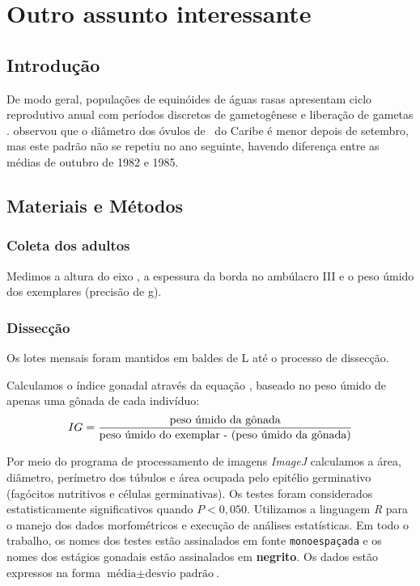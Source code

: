 \chapter{Outro assunto interessante}\label{cap3}

\section{Introdução}\label{cap3:intro}

De modo geral, populações de equinóides de águas rasas apresentam ciclo reprodutivo anual com períodos discretos de gametogênese e liberação de gametas \citep{Pearse1991}.
\citet{Lessios1987} observou que o diâmetro dos óvulos de \subdeshort\ do Caribe é menor depois de setembro, mas este padrão não se repetiu no ano seguinte, havendo diferença entre as médias de outubro de 1982 e 1985.

\section{Materiais e Métodos}\label{cap3:mem}

\subsection{Coleta dos adultos}\label{cap3:mem:coleta}

Medimos a altura do eixo , a espessura da borda no ambúlacro III e o peso úmido dos exemplares (precisão de \unit[0,1]{g}).

\subsection{Dissecção}\label{cap3:mem:diss}

Os lotes mensais foram mantidos em baldes de \unit[30]{L} até o processo de dissecção.

Calculamos o índice gonadal através da equação \citep[adaptado de][]{MacCord2004}, baseado no peso úmido de apenas uma gônada de cada indivíduo:
\begin{equation}\label{eq:ind}\notag
IG=\frac{\text{peso úmido da gônada}}{\text{peso úmido do exemplar - (peso úmido da gônada)}}
\end{equation}

Por meio do programa de processamento de imagens \emph{ImageJ} \citep{Rasband1997} calculamos a área, diâmetro, perímetro dos túbulos e área ocupada pelo epitélio germinativo (fagócitos nutritivos e células germinativas).
Os testes foram considerados estatisticamente significativos quando $P<0,050$.
Utilizamos a linguagem \emph{R} \citep{R2005} para o manejo dos dados morfométricos e execução de análises estatísticas.
Em todo o trabalho, os nomes dos testes estão assinalados em fonte \texttt{monoespaçada} e os nomes dos estágios gonadais estão assinalados em \textbf{negrito}.
Os dados estão expressos na forma $\text{média} \pm \text{desvio padrão}$.

